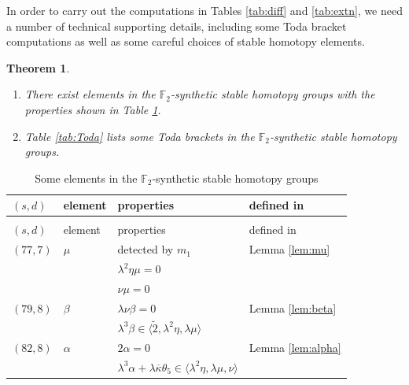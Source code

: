 \documentclass{amsart}
\newtheorem{thm}{Theorem}[section]
\theoremstyle{definition}
\newcommand{\F}{\mathbb{F}}
\newcommand{\hsf}{\widetilde{2}}
\newcommand{\kappabar}{\overline{\kappa}}
\begin{document}
In order to carry out the computations in Tables \ref{tab:diff} and \ref{tab:extn}, we need a number of technical supporting details,
including some Toda bracket computations as well as some careful
choices of stable homotopy elements.  

\begin{thm}
\label{thm:defn-Toda}
\mbox{}
\begin{enumerate}
\item
There exist elements in the $\F_2$-synthetic stable homotopy groups with the properties shown in Table \ref{tab:elements}.
\item
Table \ref{tab:Toda} lists some Toda brackets in the $\F_2$-synthetic stable homotopy groups.
\end{enumerate}
\end{thm}



\begin{longtable}{llll}
\caption{Some elements in the $\F_2$-synthetic stable
homotopy groups \label{tab:elements}
} \\
\toprule
$(s,d)$ & element & properties & defined in \\
\midrule \endfirsthead
\caption[]{Some elements in the $\F_2$-synthetic stable
homotopy groups} \\
\toprule
$(s,d)$ & element & properties & defined in \\
\midrule \endhead
\bottomrule \endfoot
$(77, 7)$ & $\mu$ & detected by $m_1$ & Lemma \ref{lem:mu} \\
& & $\lambda^2 \eta \mu = 0$\\
& &  $\nu \mu = 0$ \\
$(79, 8)$ & $\beta$ & $\lambda \nu \beta = 0$ & Lemma \ref{lem:beta} \\
& & $\lambda^3 \beta \in \langle \hsf, \lambda^2 \eta, \lambda \mu \rangle$ \\
$(82, 8)$ & $\alpha$ & $2 \alpha = 0$ & Lemma \ref{lem:alpha} \\
& & $\lambda^3 \alpha + \lambda \kappabar \theta_5 \in \langle \lambda^2 \eta, \lambda \mu, \nu \rangle$ \\
\end{longtable}
\end{document}

